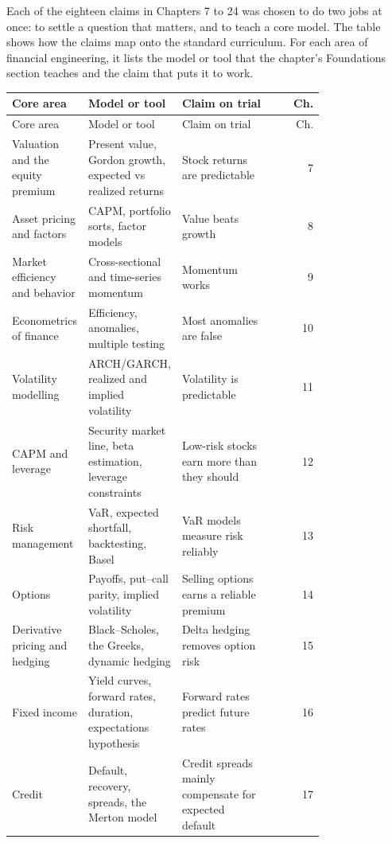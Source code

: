 Each of the eighteen claims in Chapters 7 to 24 was chosen to do two jobs at once: to settle a question that matters, and to teach a core model. The table shows how the claims map onto the standard curriculum. For each area of financial engineering, it lists the model or tool that the chapter's Foundations section teaches and the claim that puts it to work.

\begingroup
\small
\setlength{\LTpre}{6pt}\setlength{\LTpost}{6pt}
\begin{longtable}{@{}>{\raggedright\arraybackslash}p{0.198\linewidth}>{\raggedright\arraybackslash}p{0.288\linewidth}>{\raggedright\arraybackslash}p{0.297\linewidth}r@{}}
\toprule
Core area & Model or tool & Claim on trial & Ch. \\
\midrule
\endfirsthead
\toprule
Core area & Model or tool & Claim on trial & Ch. \\
\midrule
\endhead
\bottomrule
\endlastfoot
Valuation and the equity premium & Present value, Gordon growth, expected vs realized returns & Stock returns are predictable & 7 \\
Asset pricing and factors & CAPM, portfolio sorts, factor models & Value beats growth & 8 \\
Market efficiency and behavior & Cross-sectional and time-series momentum & Momentum works & 9 \\
Econometrics of finance & Efficiency, anomalies, multiple testing & Most anomalies are false & 10 \\
Volatility modelling & ARCH/GARCH, realized and implied volatility & Volatility is predictable & 11 \\
CAPM and leverage & Security market line, beta estimation, leverage constraints & Low-risk stocks earn more than they should & 12 \\
Risk management & VaR, expected shortfall, backtesting, Basel & VaR models measure risk reliably & 13 \\
Options & Payoffs, put--call parity, implied volatility & Selling options earns a reliable premium & 14 \\
Derivative pricing and hedging & Black--Scholes, the Greeks, dynamic hedging & Delta hedging removes option risk & 15 \\
Fixed income & Yield curves, forward rates, duration, expectations hypothesis & Forward rates predict future rates & 16 \\
Credit & Default, recovery, spreads, the Merton model & Credit spreads mainly compensate for expected default & 17 \\

\end{longtable}
